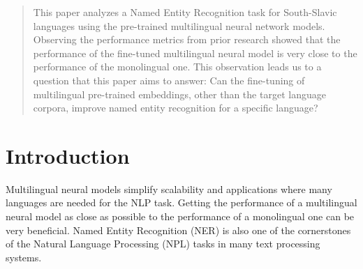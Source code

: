 \documentclass[sigconf]{acmart}
\begin{document}
\renewcommand{\shortauthors}{Ivačič et al.}

\begin{abstract}
  This paper analyzes a Named Entity Recognition task for South-Slavic languages using the pre-trained multilingual neural network models.
  Observing the performance metrics from prior research showed that the performance of the fine-tuned multilingual neural model is very close to the performance of the monolingual one.
  This observation leads us to a question that this paper aims to answer: Can the fine-tuning of multilingual pre-trained embeddings, other than the target language corpora, improve named entity recognition for a specific language?
\end{abstract}



\maketitle

\section{Introduction}
\label{sec:introduction}
Multilingual neural models simplify scalability and applications where many languages are needed for the NLP task.
Getting the performance of a multilingual neural model as close as possible to the performance of a monolingual one can be very beneficial.
Named Entity Recognition (NER) is also one of the cornerstones of the Natural Language Processing (NPL) tasks in many text processing systems.
\end{document}
